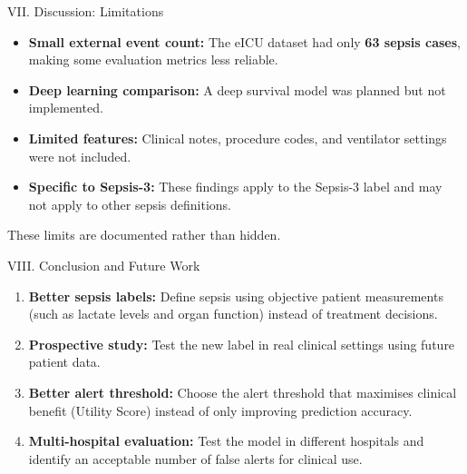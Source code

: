 \begin{frame}{VII. Discussion: Limitations}
\begin{itemize}\itemsep4pt
  \item \textbf{Small external event count:} The eICU dataset had only
        \textbf{63 sepsis cases}, making some evaluation metrics less
        reliable.
  \item \textbf{Deep learning comparison:} A deep survival model was planned
        but not implemented.
  \item \textbf{Limited features:} Clinical notes, procedure codes, and
        ventilator settings were not included.
  \item \textbf{Specific to Sepsis-3:} These findings apply to the Sepsis-3
        label and may not apply to other sepsis definitions.
\end{itemize}

\vspace{8pt}
\begin{exampleblock}{}
  \centering These limits are documented rather than hidden.
\end{exampleblock}
\end{frame}


\begin{frame}{VIII. Conclusion and Future Work}
\begin{enumerate}\itemsep4pt
  \item \textbf{Better sepsis labels:} Define sepsis using objective patient
        measurements (such as lactate levels and organ function) instead of
        treatment decisions.
  \item \textbf{Prospective study:} Test the new label in real clinical
        settings using future patient data.
  \item \textbf{Better alert threshold:} Choose the alert threshold that
        maximises clinical benefit (Utility Score) instead of only improving
        prediction accuracy.
  \item \textbf{Multi-hospital evaluation:} Test the model in different
        hospitals and identify an acceptable number of false alerts for
        clinical use.
\end{enumerate}
\end{frame}
